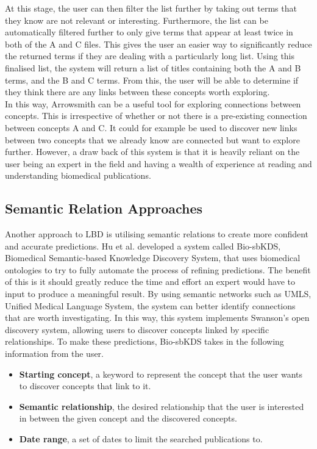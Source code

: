 \documentclass{l4proj}
\begin{document}
At this stage, the user can then filter the list further by taking out terms that they know are not relevant or interesting. Furthermore, the list can be automatically filtered further to only give terms that appear at least twice in both of the A and C files. This gives the user an easier way to significantly reduce the returned terms if they are dealing with a particularly long list. Using this finalised list, the system will return a list of titles containing both the A and B terms, and the B and C terms. From this, the user will be able to determine if they think there are any links between these concepts worth exploring. \\

In this way, Arrowsmith can be a useful tool for exploring connections between concepts. This is irrespective of whether or not there is a pre-existing connection between concepts A and C. It could for example be used to discover new links between two concepts that we already know are connected but want to explore further. However, a draw back of this system is that it is heavily reliant on the user being an expert in the field and having a wealth of experience at reading and understanding biomedical publications. \\ 

\subsection{Semantic Relation Approaches}

Another approach to LBD is utilising semantic relations to create more confident and accurate predictions. Hu et al. developed a system called Bio-sbKDS, Biomedical Semantic-based Knowledge Discovery System, that uses biomedical ontologies to try to fully automate the process of refining predictions. The benefit of this is it should greatly reduce the time and effort an expert would have to input to produce a meaningful result. By using semantic networks such as UMLS, Unified Medical Language System, the system can better identify connections that are worth investigating. In this way, this system implements Swanson's open discovery system, allowing users to discover concepts linked by specific relationships. To make these predictions, Bio-sbKDS takes in the following information from the user. 
\\ 
\begin{itemize}
    \item \textbf{Starting concept}, a keyword to represent the concept that the user wants to discover concepts that link to it. \\
    \item \textbf{Semantic relationship}, the desired relationship that the user is interested in between the given concept and the discovered concepts. \\
    \item \textbf{Date range}, a set of dates to limit the searched publications to. \\
\end{itemize}
\end{document}
